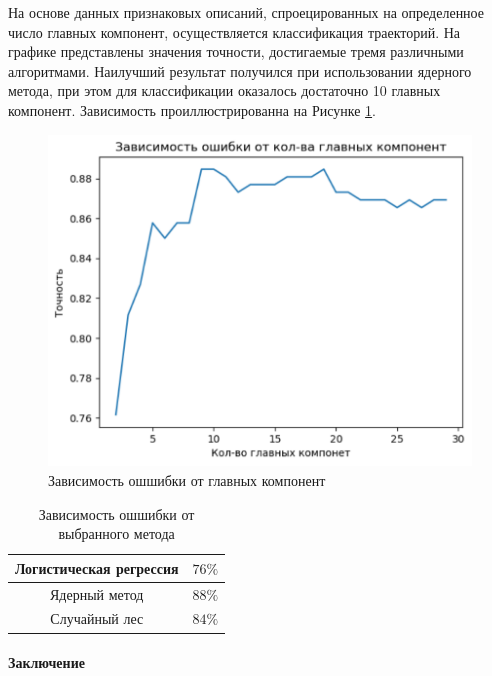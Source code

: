 \documentclass[12pt, twoside]{article}
\begin{document}

На основе данных признаковых описаний, спроецированных на определенное число главных компонент, осуществляется классификация траекторий. На графике представлены значения точности, достигаемые тремя различными алгоритмами. Наилучший результат получился при использовании ядерного метода, при этом для классификации оказалось достаточно 10 главных компонент. Зависимость проиллюстрированна на Рисунке \ref{fig: PCA}.

\begin{figure}[H]
    \centering
    \includegraphics[scale = 0.8]{Error_per_PCA_1.pdf}
    \caption{Зависимость ошшибки от главных компонент}
    \label{fig: PCA}
\end{figure}

\begin{table}[h]
    \centering
    \begin{tabular}{|c|c|}
        \cline{1-2}
        Логистическая регрессия & $76\%$      \\ \hline
        Ядерный метод           & $88\%$      \\ \hline
        Случайный лес           & $84\%$      \\ \cline{1-2}                                
    \end{tabular}
    \caption{Зависимость ошшибки от выбранного метода}
    \label{tab: methodscomp}
\end{table}

\paragraph{Заключение}
\end{document}
